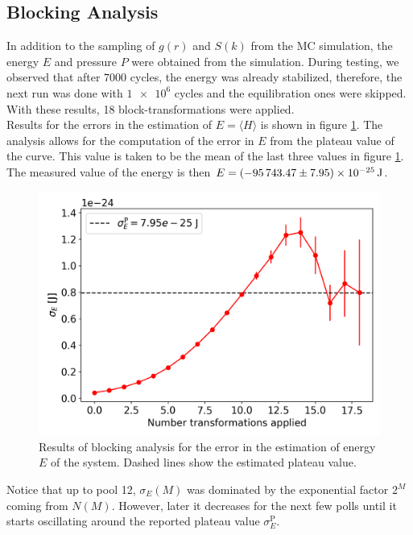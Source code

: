 \documentclass[%
aps,
pra,%
amsmath,amssymb,
preprint,%
reprint,%
notitlepage,
a4paper]{revtex4-1}
\newcommand{\average}[1]{\langle #1 \rangle}
\begin{document}
\subsection{Blocking Analysis}
In addition to the sampling of $g(r)$ and $S(k)$ from the MC simulation, the energy $E$ and pressure $P$ were obtained from the simulation. During testing, we observed that after $\num{7000}$ cycles, the energy was already stabilized, therefore, the next run was done with $\num{1e6}$ cycles and the equilibration ones were skipped. With these results, 18 block-transformations were applied.\\ Results for the errors in the estimation of $E = \average{H}$ is shown in figure \ref{fig:blockanalysis}. The analysis allows for the computation of the error in $E$ from the plateau value of the curve. This value is taken to be the mean of the last three values in figure \ref{fig:blockanalysis}. The measured value of the energy is then $E = \SI{-95743.47 \pm 7.95e-25}{\joule}$.\\
\begin{figure}
	\centering
	\includegraphics[width=0.99\linewidth]{../task2/results/block_analysis}
	\caption{Results of blocking analysis for the error in the estimation of energy $E$ of the system. Dashed lines show the estimated plateau value.}
	\label{fig:blockanalysis}
\end{figure}
Notice that up to pool 12, $\sigma_E(M)$ was dominated by the exponential factor $2^M$ coming from $N(M)$. However, later it decreases for the next few polls until it starts oscillating around the reported plateau value $\sigma_E^\mathrm{P}$.
\end{document}

